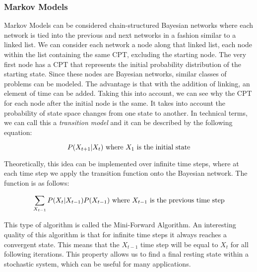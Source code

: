 \subsubsection{Markov Models}
Markov Models can be considered chain-structured Bayesian networks where each network is tied into the previous and next networks in a fashion similar to a linked list. We can consider each network a node along that linked list, each node within the list containing the same CPT, excluding the starting node. The very first node has a CPT that represents the initial probability distribution of the starting state. Since these nodes are Bayesian networks, similar classes of problems can be modeled. The advantage is that with the addition of linking, an element of time can be added. Taking this into account, we can see why the CPT for each node after the initial node is the same. It takes into account the probability of state space changes from one state to another. In technical terms, we can call this a \textit{transition model} and it can be described by the following equation:\par

\begin{equation}
  P(X_{t+1}|X_{t})
  \textnormal{ where } X_{1} \textnormal{ is the initial state}
\end{equation}

Theoretically, this idea can be implemented over infinite time steps, where at each time step we apply the transition function onto the Bayesian network. The function is as follows:\par

\begin{equation}
  \sum_{X_{t-1}} P(X_{t}|X_{t-1}) P(X_{t-1})
  \textnormal{ where } X_{t-1} \textnormal{ is the previous time step}
\end{equation}

This type of algorithm is called the Mini-Forward Algorithm. An interesting quality of this algorithm is that for infinite time steps it always reaches a convergent state. This means that the $X_{t-1}$ time step will be equal to $X_{t}$ for all following iterations. This property allows us to find a final resting state within a stochastic system, which can be useful for many applications.
